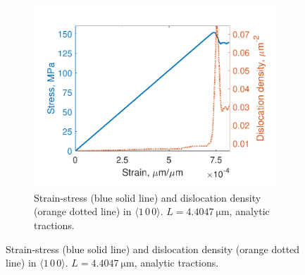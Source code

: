 \begin{figure}
    \begin{subfigure}[t]{0.45\linewidth}
        \includegraphics[width=\linewidth]{../data/density_16-Mar-2021_8_tensile_ni_100.pdf}
        \caption{Strain-stress (blue solid line) and dislocation density (orange dotted line) in $\langle 1\, 0\, 0 \rangle$. $L = \SI{4.4047}{\micro\metre}$, analytic tractions.}
        \label{sf:sressDens3}
    \end{subfigure}


\end{figure}
